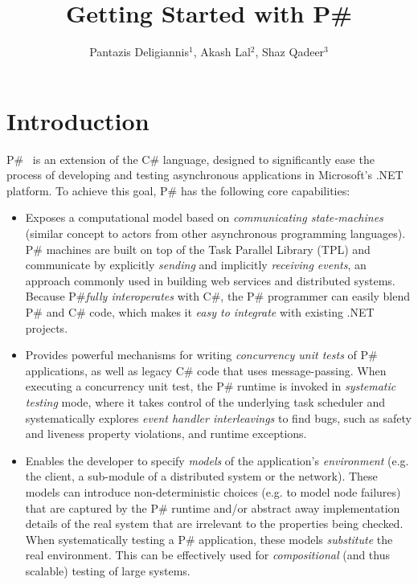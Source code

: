 \documentclass{llncs}
\newcommand{\ps}{P\#\xspace}
\newcommand{\cs}{C\#\xspace}
\begin{document}
\title{Getting Started with \ps}

\author{Pantazis Deligiannis$^1$, Akash Lal$^2$, Shaz Qadeer$^3$}

\maketitle

\section{Introduction}
\label{sec:intro}

\ps~\cite{pd2015psharp} is an extension of the \cs language, designed to significantly ease the process of developing and testing asynchronous applications in Microsoft's .NET platform. To achieve this goal, \ps has the following core capabilities:

\begin{itemize}
\item Exposes a computational model based on \emph{communicating state-machines} (similar concept to actors from other asynchronous programming languages). \ps machines are built on top of the Task Parallel Library (TPL) and communicate by explicitly \emph{sending} and implicitly \emph{receiving events}, an approach commonly used in building web services and distributed systems. Because \ps \emph{fully interoperates} with \cs, the \ps programmer can easily blend \ps and \cs code, which makes it \emph{easy to integrate} with existing .NET projects.

\item Provides powerful mechanisms for writing \emph{concurrency unit tests} of \ps applications, as well as legacy \cs code that uses message-passing. When executing a concurrency unit test, the \ps runtime is invoked in \emph{systematic testing} mode, where it takes control of the underlying task scheduler and systematically explores \emph{event handler interleavings} to find bugs, such as safety and liveness property violations, and runtime exceptions.

\item Enables the developer to specify \emph{models} of the application's \emph{environment} (e.g. the client, a sub-module of a distributed system or the network). These models can introduce non-deterministic choices (e.g. to model node failures) that are captured by the \ps runtime and/or abstract away implementation details of the real system that are irrelevant to the properties being checked. When systematically testing a \ps application, these models \emph{substitute} the real environment. This can be effectively used for \emph{compositional} (and thus scalable) testing of large systems.
\end{itemize}
\end{document}
